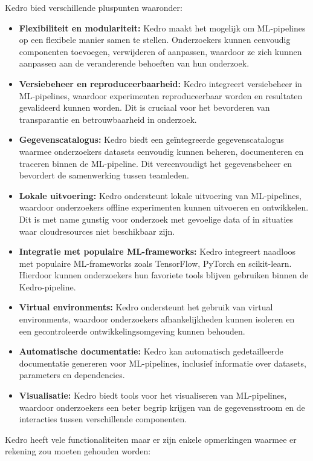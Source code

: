 Kedro bied verschillende pluspunten waaronder:
\begin{itemize}
    \item \textbf{Flexibiliteit en modulariteit:} Kedro maakt het mogelijk om ML-pipelines op een flexibele manier samen te stellen. Onderzoekers kunnen eenvoudig componenten toevoegen, verwijderen of aanpassen, waardoor ze zich kunnen aanpassen aan de veranderende behoeften van hun onderzoek.
    \item \textbf{Versiebeheer en reproduceerbaarheid:} Kedro integreert versiebeheer in ML-pipelines, waardoor experimenten reproduceerbaar worden en resultaten gevalideerd kunnen worden. Dit is cruciaal voor het bevorderen van transparantie en betrouwbaarheid in onderzoek.
    \item \textbf{Gegevenscatalogus:} Kedro biedt een geïntegreerde gegevenscatalogus waarmee onderzoekers datasets eenvoudig kunnen beheren, documenteren en traceren binnen de ML-pipeline. Dit vereenvoudigt het gegevensbeheer en bevordert de samenwerking tussen teamleden.
    \item \textbf{Lokale uitvoering:} Kedro ondersteunt lokale uitvoering van ML-pipelines, waardoor onderzoekers offline experimenten kunnen uitvoeren en ontwikkelen. Dit is met name gunstig voor onderzoek met gevoelige data of in situaties waar cloudresources niet beschikbaar zijn.
    \item \textbf{Integratie met populaire ML-frameworks:} Kedro integreert naadloos met populaire ML-frameworks zoals TensorFlow, PyTorch en scikit-learn. Hierdoor kunnen onderzoekers hun favoriete tools blijven gebruiken binnen de Kedro-pipeline.
    \item \textbf{Virtual environments:} Kedro ondersteunt het gebruik van virtual environments, waardoor onderzoekers afhankelijkheden kunnen isoleren en een gecontroleerde ontwikkelingsomgeving kunnen behouden.
    \item \textbf{Automatische documentatie:} Kedro kan automatisch gedetailleerde documentatie genereren voor ML-pipelines, inclusief informatie over datasets, parameters en dependencies.
    \item \textbf{Visualisatie:} Kedro biedt tools voor het visualiseren van ML-pipelines, waardoor onderzoekers een beter begrip krijgen van de gegevensstroom en de interacties tussen verschillende componenten.
\end{itemize}

Kedro heeft vele functionaliteiten maar er zijn enkele opmerkingen waarmee er rekening zou moeten gehouden worden:

